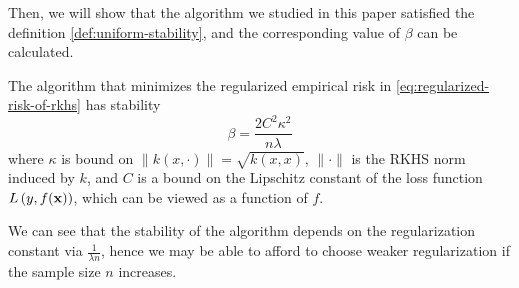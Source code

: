 Then, we will show that the algorithm we studied in this paper satisfied the definition \ref{def:uniform-stability}, and the corresponding value of $\beta$ can be calculated.

\begin{theorem}
	\label{thm:algorithmic-stability-of-risk-minimizers}
	The algorithm that minimizes the regularized empirical risk in \eqref{eq:regularized-risk-of-rkhs} has stability
	\begin{equation}
		\beta=\frac{2C^{2}\kappa^{2}}{n\lambda}
	\end{equation}
	where $\kappa$ is bound on $\|k(x,\cdot)\|=\sqrt{k(x,x)}$, $\|\cdot\|$ is the RKHS norm induced by $k$, and $C$ is a bound on the Lipschitz constant of the loss function $L\left(y,f({\bf x})\right)$, which can be viewed as a function of $f$.
\end{theorem}

\begin{remark}
	We can see that the stability of the algorithm depends on the regularization constant via $\frac{1}{\lambda n}$, hence we may be able to afford to choose weaker regularization if the sample size $n$ increases.
\end{remark}

